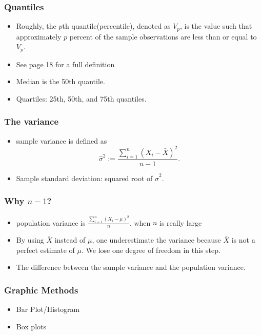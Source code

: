 \begin{frame} \frametitle{Quantiles}
  \begin{itemize}
  \item Roughly, the $p$th quantile(percentile), denoted as $V_p$, is the value
    such that approximately $p$ percent of the sample observations are less
    than or equal to $V_p$.
  \item See page 18 for a full definition
  \item Median is the 50th quantile.
  \item Quartiles: 25th, 50th, and 75th quantiles.
  \end{itemize}
\end{frame}

\begin{frame} \frametitle{The variance}
  \begin{itemize}
  \item sample variance is defined as
    \begin{equation}
      \label{eq:var}
      \hat{\sigma}^{2} := \frac{ \sum_{i=1}^{n} \left(X_{i} - \bar{X}\right)^{2}}{n-1}.
    \end{equation}
  \item Sample standard deviation: squared root of $\hat{\sigma}^{2}$.
  \end{itemize}
\end{frame}

\begin{frame} \frametitle{Why $n-1$?}
  \begin{itemize}
  \item population variance is $\frac{\sum_{i=1}^{n} (X_i
      -\mu)^{2}}{n}$, when $n$ is really large
  \item By using $\bar{X}$ instead of $\mu$, one \alert{underestimate}
    the variance because $\bar{X}$ is not a perfect estimate of
    $\mu$. We lose one degree of freedom in this step.
  \item The difference between the sample variance and the population
    variance.
  \end{itemize}
\end{frame}

\begin{frame} \frametitle{Graphic Methods}
  \begin{itemize}
  \item Bar Plot/Histogram
  \item Box plots
  \end{itemize}
\end{frame}

